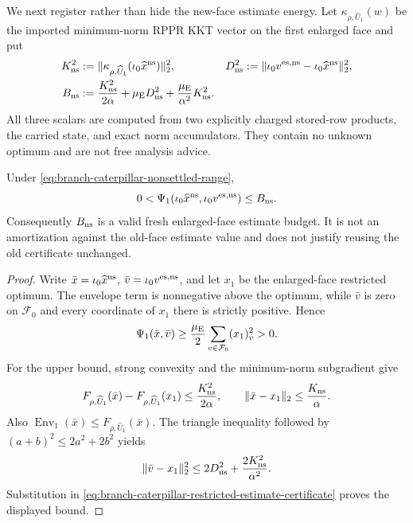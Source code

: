 We next register rather than hide the new-face estimate energy.  Let
$\kappa_{\rho,\widehat U_1}(w)$ be the imported minimum-norm RPPR KKT vector
on the first enlarged face and put
\begin{align}
 K_{\rm ns}^2
 &:=\lVert\kappa_{\rho,\widehat U_1}
              (\iota_0\widehat x^{\rm ns})\rVert_2^2,
 &D_{\rm ns}^2
 &:=\lVert\iota_0v^{{\rm es},{\rm ns}}
              -\iota_0\widehat x^{\rm ns}\rVert_2^2,
 \notag\\
 B_{\rm ns}
 &:=\frac{K_{\rm ns}^2}{2\alpha}
   +\mu_{\rm E}D_{\rm ns}^2
   +\frac{\mu_{\rm E}}{\alpha^2}K_{\rm ns}^2.
 \label{eq:branch-caterpillar-nonsettled-shock-budget}
\end{align}
All three scalars are computed from two explicitly charged stored-row
products, the carried state, and exact norm accumulators.  They contain no
unknown optimum and are not free analysis advice.

\begin{lemma}
\label{lem:branch-caterpillar-nonsettled-shock-reset}
Under \cref{eq:branch-caterpillar-nonsettled-range},
\begin{equation}
 0<\Psi_1(\iota_0\widehat x^{\rm ns},
          \iota_0v^{{\rm es},{\rm ns}})
 \leq B_{\rm ns}.
 \label{eq:branch-caterpillar-nonsettled-shock-bound}
\end{equation}
Consequently $B_{\rm ns}$ is a valid fresh enlarged-face estimate budget.
It is not an amortization against the old-face estimate value and does not
justify reusing the old certificate unchanged.
\end{lemma}

\begin{proof}
Write $\bar x=\iota_0\widehat x^{\rm ns}$,
$\bar v=\iota_0v^{{\rm es},{\rm ns}}$, and let $x_1$ be the enlarged-face
restricted optimum.  The envelope term is nonnegative above the optimum,
while $\bar v$ is zero on $\mathcal F_0$ and every coordinate of $x_1$ there
is strictly positive.  Hence
\[
 \Psi_1(\bar x,\bar v)
 \geq\frac{\mu_{\rm E}}2
      \sum_{v\in\mathcal F_0}(x_1)_v^2>0.
\]
For the upper bound, strong convexity and the minimum-norm subgradient give
\[
 F_{\rho,\widehat U_1}(\bar x)-F_{\rho,\widehat U_1}(x_1)
 \leq\frac{K_{\rm ns}^2}{2\alpha},
 \qquad
 \lVert\bar x-x_1\rVert_2\leq\frac{K_{\rm ns}}\alpha.
\]
Also $\operatorname{Env}_1(\bar x)\leq
F_{\rho,\widehat U_1}(\bar x)$.  The triangle inequality followed by
$(a+b)^2\leq2a^2+2b^2$ yields
\[
 \lVert\bar v-x_1\rVert_2^2
 \leq2D_{\rm ns}^2+\frac{2K_{\rm ns}^2}{\alpha^2}.
\]
Substitution in \cref{eq:branch-caterpillar-restricted-estimate-certificate}
proves the displayed bound.
\end{proof}

